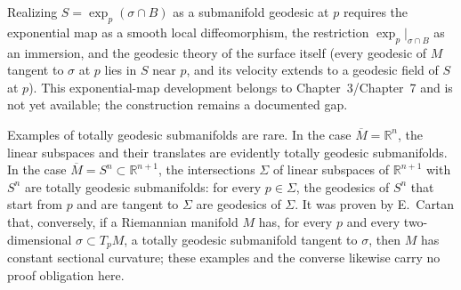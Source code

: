 \begin{remark}
  \label{rem:dc-ch6-2-9-exp-surface}
  \notready
  Realizing $S=\exp_p(\sigma\cap B)$ as a submanifold geodesic at $p$ requires
  the exponential map as a smooth local diffeomorphism, the restriction
  $\exp_p|_{\sigma\cap B}$ as an immersion, and the geodesic theory of the
  surface itself (every geodesic of $M$ tangent to $\sigma$ at $p$ lies in $S$
  near $p$, and its velocity extends to a geodesic field of $S$ at $p$). This
  exponential-map development belongs to Chapter~3/Chapter~7 and is not yet
  available; the construction remains a documented gap.

  Examples of totally geodesic submanifolds are rare. In the case
  $\overline{M}=\mathbb{R}^n$, the linear subspaces and their translates are
  evidently totally geodesic submanifolds. In the case
  $\overline{M}=S^n\subset\mathbb{R}^{n+1}$, the intersections $\Sigma$ of
  linear subspaces of $\mathbb{R}^{n+1}$ with $S^n$ are totally geodesic
  submanifolds: for every $p\in\Sigma$, the geodesics of $S^n$ that start from
  $p$ and are tangent to $\Sigma$ are geodesics of $\Sigma$. It was proven by
  E.~Cartan that, conversely, if a Riemannian manifold $M$ has, for every $p$
  and every two-dimensional $\sigma\subset T_pM$, a totally geodesic
  submanifold tangent to $\sigma$, then $M$ has constant sectional curvature;
  these examples and the converse likewise carry no proof obligation here.
\end{remark}

